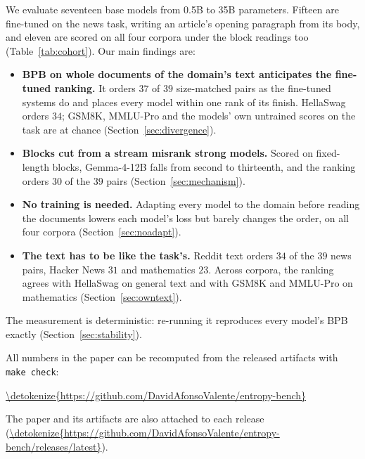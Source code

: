 \documentclass[10pt]{article}
\newif\ifanon \anonfalse
\newcommand{\repourl}{https://github.com/DavidAfonsoValente/entropy-bench}
\newcommand{\repolink}[1]{\expandafter\url\expandafter{\detokenize\expandafter{\repourl#1}}}
\begin{document}
We evaluate seventeen base models from 0.5B to 35B parameters. Fifteen are fine-tuned on the news
task, writing an article's opening paragraph from its body, and eleven are scored on all four
corpora under the block readings too (Table~\ref{tab:cohort}). Our main findings are:
\begin{itemize}[leftmargin=1.2em,itemsep=2pt,topsep=3pt]
\item \textbf{BPB on whole documents of the domain's text anticipates the fine-tuned ranking.} It
orders $37$ of $39$ size-matched pairs as the fine-tuned systems do and places every model within one
rank of its finish. HellaSwag orders $34$; GSM8K, MMLU-Pro and the models' own untrained scores on
the task are at chance (Section~\ref{sec:divergence}).
\item \textbf{Blocks cut from a stream misrank strong models.} Scored on fixed-length blocks,
Gemma-4-12B falls from second to thirteenth, and the ranking orders $30$ of the $39$ pairs
(Section~\ref{sec:mechanism}).
\item \textbf{No training is needed.} Adapting every model to the domain before reading the
documents lowers each model's loss but barely changes the order, on all four corpora
(Section~\ref{sec:noadapt}).
\item \textbf{The text has to be like the task's.} Reddit text orders $34$ of the $39$ news pairs,
Hacker News $31$ and mathematics $23$.
Across corpora, the ranking agrees with HellaSwag on general text and with GSM8K and MMLU-Pro on
mathematics (Section~\ref{sec:owntext}).
\end{itemize}
The measurement is deterministic: re-running it reproduces every model's BPB exactly
(Section~\ref{sec:stability}).
\ifanon
Code and artifacts are provided as supplementary material, and every number in the paper can be
recomputed from them with \texttt{make check}.
\else
All numbers in the paper can be recomputed from the released artifacts with \texttt{make check}:
\begin{center}\repolink{}\end{center}
The paper and its artifacts are also attached to each release (\repolink{/releases/latest}).
\fi
\end{document}
